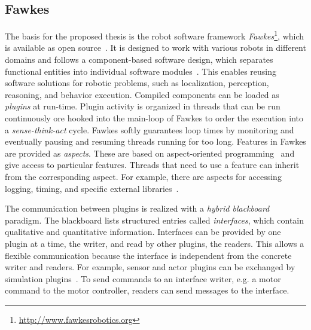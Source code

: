 \subsection{Fawkes}
\label{sec:fawkes}
The basis for the proposed thesis is the robot software framework
\emph{Fawkes}\footnote{\url{http://www.fawkesrobotics.org}}, which is
available as open source~\cite{FawkesDesign,Fawkes-RCLL-2014}.
It is designed to work with
various robots in different domains and follows a component-based
software design, which separates functional entities into individual
software modules~\cite{component}. This enables reusing
software solutions for robotic problems, such as localization,
perception, reasoning, and behavior execution. Compiled
components can be loaded as \emph{plugins} at run-time.
%
Plugin activity is organized in threads
that can be run continuously ore hooked into
the main-loop of Fawkes to order the execution into a
\emph{sense-think-act} cycle.
Fawkes softly guarantees loop times by
monitoring and eventually pausing and resuming threads running for too
long.
Features in Fawkes are provided as \emph{aspects}. These are
based on aspect-oriented programming~\cite{aspect_oriented} and give
access to particular features. Threads that need to use a feature can
inherit from the corresponding aspect. For example, there are aspects
for accessing logging, timing, and specific external libraries~\cite{tnthesis}.

The communication between plugins is realized with a \emph{hybrid blackboard}
paradigm. The blackboard lists structured entries called
\emph{interfaces}, which contain qualitative and quantitative information.
Interfaces can be
provided by one plugin at a time, the writer, and read by other
plugins, the readers. This allows a flexible communication
because the interface is independent from the concrete writer and readers.
For example, sensor and actor plugins can be exchanged by simulation
plugins~\cite{LLSF-Sim}.
To send commands to an interface writer, e.g. a
motor command to the motor controller, readers can send messages to
the interface.

